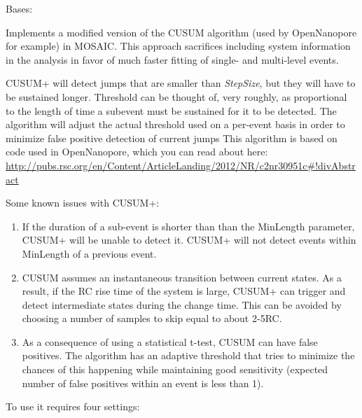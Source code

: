 \documentclass[letterpaper,10pt,english]{sphinxmanual}
\begin{document}
\begin{fulllineitems}
\label{api-doc/mosaic.processing:mosaic.cusumPlus.cusumPlus}
Bases: {\hyperref[api\string-doc/mosaic.meta:mosaic.metaEventProcessor.metaEventProcessor]{\emph{}}}

Implements a modified version of the CUSUM algorithm (used by OpenNanopore for example) in MOSAIC. This approach sacrifices including system information in the analysis in favor of much faster fitting of single- and multi-level events.

CUSUM+ will detect jumps that are smaller than \emph{StepSize}, but they will have to be sustained longer. Threshold can be thought of, very roughly, as proportional to the length of time a subevent must be sustained for it to be detected. The algorithm will adjust the actual threshold used on a per-event basis in order to minimize false positive detection of current jumps This algorithm is based on code used in OpenNanopore, which you can read about here: \href{http://pubs.rsc.org/en/Content/ArticleLanding/2012/NR/c2nr30951c\#!divAbstract}{http://pubs.rsc.org/en/Content/ArticleLanding/2012/NR/c2nr30951c\#!divAbstract}

Some known issues with CUSUM+:
\begin{enumerate}
\item {} 
If the duration of a sub-event is shorter than than the MinLength parameter, CUSUM+ will be unable to detect it. CUSUM+ will not detect events within MinLength of a previous event.

\item {} 
CUSUM assumes an instantaneous transition between current states. As a result, if the RC rise time of the system is large, CUSUM+ can trigger and detect intermediate states during the change time. This can be avoided by choosing a number of samples to skip equal to about 2-5RC.

\item {} 
As a consequence of using a statistical t-test, CUSUM can have false positives. The algorithm has an adaptive threshold that tries to minimize the chances of this happening while maintaining good sensitivity (expected number of false positives within an event is less than 1).

\end{enumerate}

To use it requires four settings:
\begin{quote}


\end{quote}
\end{fulllineitems}
\end{document}
